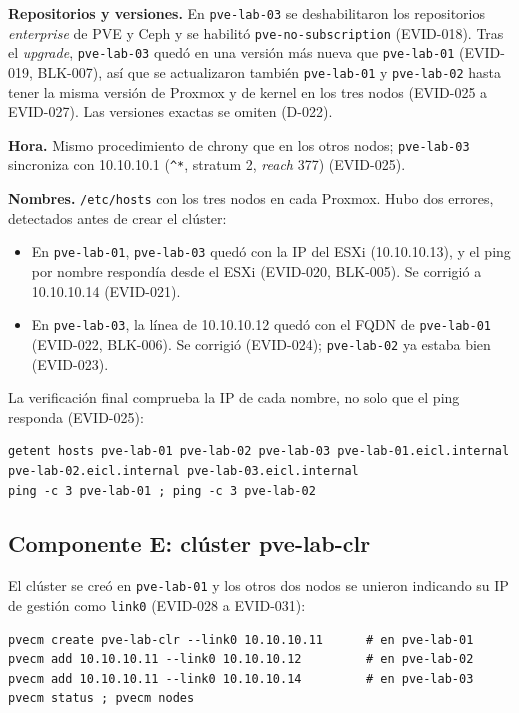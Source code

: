 \documentclass[11pt,a4paper]{article}
\begin{document}
\textbf{Repositorios y versiones.} En \texttt{pve-lab-03} se deshabilitaron los repositorios \emph{enterprise} de PVE y Ceph y se habilitó \texttt{pve-no-subscription} (EVID-018). Tras el \emph{upgrade}, \texttt{pve-lab-03} quedó en una versión más nueva que \texttt{pve-lab-01} (EVID-019, BLK-007), así que se actualizaron también \texttt{pve-lab-01} y \texttt{pve-lab-02} hasta tener la misma versión de Proxmox y de kernel en los tres nodos (EVID-025 a EVID-027). Las versiones exactas se omiten (D-022).

\textbf{Hora.} Mismo procedimiento de chrony que en los otros nodos; \texttt{pve-lab-03} sincroniza con 10.10.10.1 (\texttt{\^{}*}, stratum 2, \emph{reach} 377) (EVID-025).

\textbf{Nombres.} \texttt{/etc/hosts} con los tres nodos en cada Proxmox. Hubo dos errores, detectados antes de crear el clúster:
\begin{itemize}
  \item En \texttt{pve-lab-01}, \texttt{pve-lab-03} quedó con la IP del ESXi (10.10.10.13), y el ping por nombre respondía desde el ESXi (EVID-020, BLK-005). Se corrigió a 10.10.10.14 (EVID-021).
  \item En \texttt{pve-lab-03}, la línea de 10.10.10.12 quedó con el FQDN de \texttt{pve-lab-01} (EVID-022, BLK-006). Se corrigió (EVID-024); \texttt{pve-lab-02} ya estaba bien (EVID-023).
\end{itemize}
La verificación final comprueba la IP de cada nombre, no solo que el ping responda (EVID-025):
\begin{lstlisting}
getent hosts pve-lab-01 pve-lab-02 pve-lab-03 pve-lab-01.eicl.internal pve-lab-02.eicl.internal pve-lab-03.eicl.internal
ping -c 3 pve-lab-01 ; ping -c 3 pve-lab-02
\end{lstlisting}

\subsection{Componente E: clúster pve-lab-clr}
El clúster se creó en \texttt{pve-lab-01} y los otros dos nodos se unieron indicando su IP de gestión como \texttt{link0} (EVID-028 a EVID-031):
\begin{lstlisting}
pvecm create pve-lab-clr --link0 10.10.10.11      # en pve-lab-01
pvecm add 10.10.10.11 --link0 10.10.10.12         # en pve-lab-02
pvecm add 10.10.10.11 --link0 10.10.10.14         # en pve-lab-03
pvecm status ; pvecm nodes
\end{lstlisting}
\end{document}
